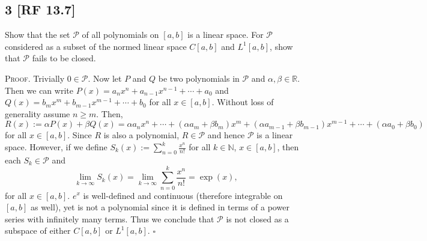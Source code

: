 \documentclass[12pt]{article}
\newcounter{ProofCounter}
\newenvironment{Proof}{\stepcounter{ProofCounter}\textsc{Proof.}}{\hfill$\square$}
\begin{document}
\newpage
\subsection*{3 [RF 13.7]}
\begin{tcolorbox}
  Show that the set $\mathcal{P}$ of all polynomials on $[a,b]$ is a linear space. For $\mathcal{P}$ considered as a subset of the normed linear
  space $C[a,b]$ and $L^{1}[a,b]$, show that $\mathcal{P}$ fails to be closed.
\end{tcolorbox}
\begin{Proof}
  Trivially $0 \in \mathcal{P}$. Now let $P$ and $Q$ be two polynomials in $\mathcal{P}$ and $\alpha,\beta \in \mathbb{R}$. Then we can write 
  $P(x) = a_n x^{n} + a_{n-1}x^{n-1} + \cdots + a_{0}$ and $Q(x) = b_{m} x^{m} + b_{m-1}x^{m-1} + \cdots + b_{0}$
  for all $x \in [a,b]$. Without loss of generality assume $n \geq m$. Then,
  \[ 
    R(x) := \alpha P(x) + \beta Q(x) = \alpha a_n x^{n} + \cdots + (\alpha a_{m} + \beta b_{m})x^{m} + (\alpha a_{m-1} + \beta b_{m-1})x^{m-1} + \cdots +
    (\alpha a_0 + \beta b_0)
  \]
  for all $x \in [a,b]$. Since $R$ is also a polynomial, $R \in \mathcal{P}$ and hence $\mathcal{P}$ is a linear space. However, if we define $S_k(x) :=
  \sum_{n=0}^{k}\frac{x^{n}}{n!}$ for all $k \in \mathbb{N}$, $x \in [a,b]$, then each $S_k \in \mathcal{P}$ and 
  \[ 
    \lim_{k\rightarrow\infty}S_k(x) = \lim_{k\rightarrow\infty}\sum_{n=0}^{k}\frac{x^{n}}{n!} = \exp(x),
  \]
  for all $x \in [a,b]$. $e^{x}$ is well-defined and continuous (therefore integrable on $[a,b]$ as well), yet is not a polynomial since it is 
  defined in terms of a power series with infinitely many
  terms. Thus we conclude that $\mathcal{P}$ is not closed as a subspace of either $C[a,b]$ or $L^{1}[a,b]$.
\end{Proof}
\end{document}
